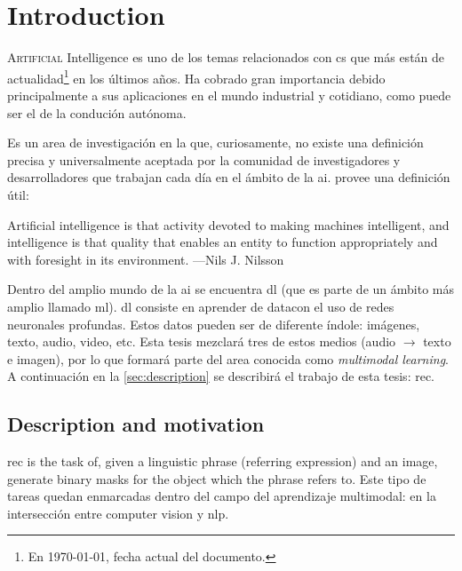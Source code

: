 

\chapter{Introduction} \label{cha:intro}


\lettrine{A}{rtificial} Intelligence es uno de los temas relacionados con
\gls{cs} que más están de actualidad\footnote{En \today, fecha actual del
  documento.} en los últimos años. Ha cobrado gran importancia debido
principalmente a sus aplicaciones en el mundo industrial y cotidiano, como
puede ser el de la condución autónoma.

Es un area de investigación en la que, curiosamente, no existe una definición
precisa y universalmente aceptada por la comunidad de investigadores y
desarrolladores que trabajan cada día en el ámbito de la
\gls{ai}.  provee una definición útil:

\begin{quoteBox}
  Artificial intelligence is that activity devoted to making machines
  intelligent, and intelligence is that quality that enables an entity to
  function appropriately and with foresight in its environment.
  \tcblower
  ---Nils J. Nilsson
\end{quoteBox}

Dentro del amplio mundo de la \gls{ai} se encuentra \gls{dl} (que es parte de
un ámbito más amplio llamado \gls{ml}). \gls{dl} consiste en aprender de
datacon el uso de redes neuronales profundas. Estos datos pueden ser de
diferente índole: imágenes, texto, audio, video, etc. Esta tesis mezclará tres
de estos medios (audio \(\rightarrow\) texto e imagen), por lo que formará
parte del area conocida como \emph{multimodal learning}. A continuación en la
\vref{sec:description} se describirá el trabajo de esta tesis: \gls{rec}.


\section{Description and motivation} \label{sec:description}

\gls{rec} is the task of, given a linguistic phrase (referring expression) and
an image, generate binary masks for the object which the phrase refers to. Este
tipo de tareas quedan enmarcadas dentro del campo del aprendizaje multimodal:
en la intersección entre computer vision y \gls{nlp}.

